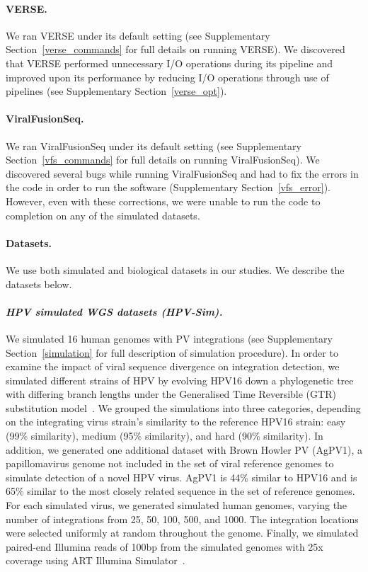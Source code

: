 \documentclass[a4,center,fleqn]{NAR}
\begin{document}
\paragraph{\textbf{VERSE.}}
We ran VERSE under its default setting (see Supplementary Section~\ref{verse_commands} for full details on running VERSE).  We discovered that VERSE performed unnecessary I/O operations during its pipeline and improved upon its performance by reducing I/O operations through use of pipelines (see Supplementary Section~\ref{verse_opt}).

\paragraph{\textbf{ViralFusionSeq.}}
We ran ViralFusionSeq under its default setting (see Supplementary Section~\ref{vfs_commands} for full details on running ViralFusionSeq).  We discovered several bugs while running ViralFusionSeq and had to fix the errors in the code in order to run the software (Supplementary Section~\ref{vfs_error}).  However, even with these corrections, we were unable to run the code to completion on any of the simulated datasets.


\paragraph{\textbf{Datasets.}}  We use both simulated and biological datasets in our studies.  We describe the datasets below.

\paragraph{\emph{HPV simulated WGS datasets (HPV-Sim).}}
We simulated 16 human genomes with PV integrations (see Supplementary Section~\ref{simulation} for full description of simulation procedure).  In order to examine the impact of viral sequence divergence on integration detection, we simulated different strains of HPV by evolving HPV16 down a phylogenetic tree with differing branch lengths under the Generalised Time Reversible (GTR) substitution model~\cite{Tavare1986}.  We grouped the simulations into three categories, depending on the integrating virus strain's similarity to the reference HPV16 strain: easy (99\% similarity), medium (95\% similarity), and hard (90\% similarity).  In addition, we generated one additional dataset with Brown Howler PV (AgPV1), a papillomavirus genome not included in the set of viral reference genomes to simulate detection of a novel HPV virus.  AgPV1 is 44\% similar to HPV16 and is 65\% similar to the most closely related sequence in the set of reference genomes.  For each simulated virus, we generated simulated human genomes, varying the number of integrations from 25, 50, 100, 500, and 1000.  The integration locations were selected uniformly at random throughout the genome.  Finally, we simulated paired-end Illumina reads of 100bp from the simulated genomes with 25x coverage using ART Illumina Simulator~\cite{Huang2012}.  
\end{document}
